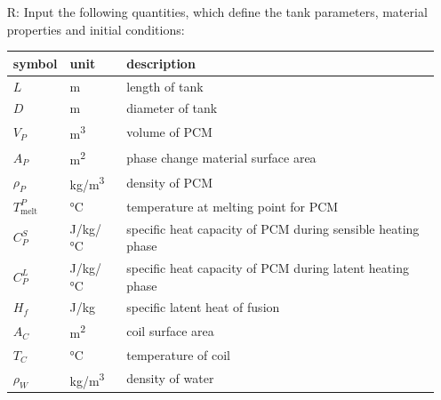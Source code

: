 \documentclass[12pt]{article}
\newcounter{reqnum} %
\begin{document}
\noindent \begin{itemize}

\item[R\refstepcounter{reqnum}\thereqnum \label{R_RawInputs}:] Input the following
  quantities, which define the tank parameters, material properties and initial
  conditions:

  \renewcommand{\arraystretch}{1.2}
  \noindent \begin{longtable*}{l l p{12cm}} \toprule
              \textbf{symbol} & \textbf{unit} & \textbf{description}\\
              \midrule 
              $L$ & \si{\metre} & length of tank\\
              $D$ & \si{\metre} & diameter of tank\\
              $V_P$ & \si[per-mode=symbol] {\cubic\meter} & volume of PCM\\
              $A_P$ & \si[per-mode=symbol] {\square\metre} & phase change material surface area\\  
              $\rho_P$ & \si[per-mode=symbol] {\kilogram\per\cubic\metre} & density of PCM\\
              $T_\text{melt}^{P}$ & \si[per-mode=symbol] {\celsius} & temperature at melting
                                                          point for PCM\\
              $C^S_P$ & \si[per-mode=symbol] {\joule\per \kilogram\per \celsius} & specific
                                                          heat capacity of PCM during sensible heating phase\\
              $C^L_P$ & \si[per-mode=symbol] {\joule\per \kilogram\per \celsius} & specific
                                                          heat capacity of PCM during latent heating phase\\
              $H_f$ & \si[per-mode=symbol] {\joule \per \kilogram} & specific latent heat of
                                                          fusion\\
              $A_C$ & \si[per-mode=symbol] {\square\metre} & coil surface area\\
              $T_C$ &\si[per-mode=symbol] {\celsius} & temperature of coil\\
              $\rho_W$ & \si[per-mode=symbol] {\kilogram\per\cubic\metre} &
                                                          density of water\\

\end{longtable*}
\end{itemize}
\end{document}
